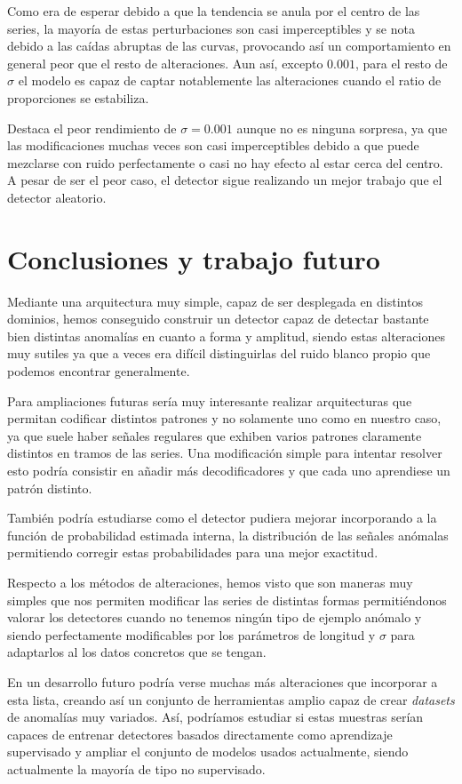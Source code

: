 Como era de esperar debido a que la tendencia se anula por el centro de las series, la mayoría de estas perturbaciones son casi imperceptibles y se nota debido a las caídas abruptas de las curvas, provocando así un comportamiento en general peor que el resto de alteraciones. Aun así, excepto $0.001$, para el resto de $\sigma$ el modelo es capaz de captar notablemente las alteraciones cuando el ratio de proporciones se estabiliza.

Destaca el peor rendimiento de $\sigma = 0.001$ aunque no es ninguna sorpresa, ya que las modificaciones muchas veces son casi imperceptibles debido a que puede mezclarse con ruido perfectamente o casi no hay efecto al estar cerca del centro. A pesar de ser el peor caso, el detector sigue realizando un mejor trabajo que el detector aleatorio.

\chapter{Conclusiones y trabajo futuro}\label{ch:ad-conclusiones}

Mediante una arquitectura muy simple, capaz de ser desplegada en distintos dominios, hemos conseguido construir un detector capaz de detectar bastante bien distintas anomalías en cuanto a forma y amplitud, siendo estas alteraciones muy sutiles ya que a veces era difícil distinguirlas del ruido blanco propio que podemos encontrar generalmente.

Para ampliaciones futuras sería muy interesante realizar arquitecturas que permitan codificar distintos patrones y no solamente uno como en nuestro caso, ya que suele haber señales regulares que exhiben varios patrones claramente distintos en tramos de las series. Una modificación simple para intentar resolver esto podría consistir en añadir más decodificadores y que cada uno aprendiese un patrón distinto.

También podría estudiarse como el detector pudiera mejorar incorporando a la función de probabilidad estimada interna, la distribución de las señales anómalas permitiendo corregir estas probabilidades para una mejor exactitud.

Respecto a los métodos de alteraciones, hemos visto que son maneras muy simples que nos permiten modificar las series de distintas formas permitiéndonos valorar los detectores cuando no tenemos ningún tipo de ejemplo anómalo y siendo perfectamente modificables por los parámetros de longitud y $\sigma$ para adaptarlos al los datos concretos que se tengan.

En un desarrollo futuro podría verse muchas más alteraciones que incorporar a esta lista, creando así un conjunto de herramientas amplio capaz de crear \emph{datasets} de anomalías muy variados. Así, podríamos estudiar si estas muestras serían capaces de entrenar detectores basados directamente como aprendizaje supervisado y ampliar el conjunto de modelos usados actualmente, siendo actualmente la mayoría de tipo no supervisado.

\endinput

